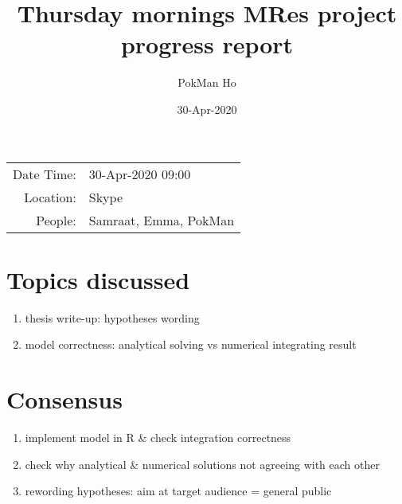 \documentclass[a4paper,11pt]{article}
\title{Thursday mornings MRes project progress report}
\author{PokMan Ho}
\date{30-Apr-2020}
\begin{document}
    \maketitle
    
    \begin{tabular}{rl}
        Date Time: & 30-Apr-2020 09:00 \\
        Location: & Skype \\
        People: & Samraat, Emma, PokMan \\
    \end{tabular}
    
    \section{Topics discussed}
    \begin{enumerate}
        \item thesis write-up: hypotheses wording
        \item model correctness: analytical solving vs numerical integrating result
    \end{enumerate}
    
    \section{Consensus}
    \begin{enumerate}
        \item implement model in R \& check integration correctness
        \item check why analytical \& numerical solutions not agreeing with each other
        \item rewording hypotheses: aim at target audience = general public
    \end{enumerate}
\end{document}

